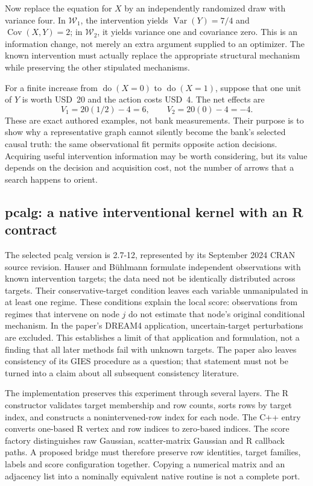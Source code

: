 Now replace the equation for $X$ by an independently randomized draw with
variance four. In $\mathcal W_1$, the intervention yields
$\operatorname{Var}(Y)=7/4$ and $\operatorname{Cov}(X,Y)=2$; in
$\mathcal W_2$, it yields variance one and covariance zero. This is an
information change, not merely an extra argument supplied to an optimizer.
The known intervention must actually replace the appropriate structural
mechanism while preserving the other stipulated mechanisms.

For a finite increase from $\operatorname{do}(X=0)$ to
$\operatorname{do}(X=1)$, suppose that one unit of $Y$ is worth USD~20 and
the action costs USD~4. The net effects are
\[
 V_1=20(1/2)-4=6,\qquad V_2=20(0)-4=-4.
\]
These are exact authored examples, not bank measurements. Their purpose is to
show why a representative graph cannot silently become the bank's selected
causal truth: the same observational fit permits opposite action decisions.
Acquiring useful intervention information may be worth considering, but its
value depends on the decision and acquisition cost, not the number of arrows
that a search happens to orient. \citep{exec16_ct_oracle}

\subsection{pcalg: a native interventional kernel with an R contract}

The selected pcalg version is 2.7-12, represented by its September 2024 CRAN
source revision. Hauser and B\"uhlmann formulate independent observations with
known intervention targets; the data need not be identically distributed
across targets. Their conservative-target condition leaves each variable
unmanipulated in at least one regime. These conditions explain the local
score: observations from regimes that intervene on node $j$ do not estimate
that node's original conditional mechanism. In the paper's DREAM4 application,
uncertain-target perturbations are excluded. This establishes a limit of that
application and formulation, not a finding that all later methods fail with
unknown targets. The paper also leaves consistency of its GIES procedure as a
question; that statement must not be turned into a claim about all subsequent
consistency literature. \citep{exec14_pt_paper_gies}

The implementation preserves this experiment through several layers. The R
constructor validates target membership and row counts, sorts rows by target
index, and constructs a nonintervened-row index for each node. The C++ entry
converts one-based R vertex and row indices to zero-based indices. The score
factory distinguishes raw Gaussian, scatter-matrix Gaussian and R callback
paths. A proposed bridge must therefore preserve row identities, target
families, labels and score configuration together. Copying a numerical matrix
and an adjacency list into a nominally equivalent native routine is not a
complete port. \citep{exec16_ct_pcalg}

